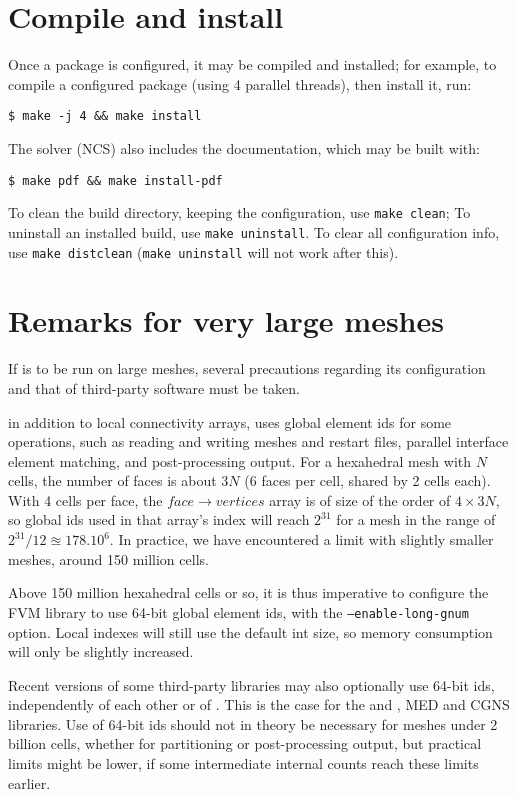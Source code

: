 \documentclass[a4paper,10pt,twoside]{article}
\begin{document}
\section{Compile and install\label{sec:compile}}

Once a package is configured, it may be compiled and installed;
for example, to compile a configured package (using 4 parallel threads),
then install it, run:

\texttt{\$ make -j 4 \&\& make install}

The solver (NCS) also includes the documentation, which may be built
with:

\texttt{\$ make pdf \&\& make install-pdf}

To clean the build directory, keeping the configuration,
use \texttt{make clean};
To uninstall an installed build, use \texttt{make uninstall}.
To clear all configuration info, use \texttt{make distclean}
(\texttt{make uninstall} will not work after this).

\section{Remarks for very large meshes\label{sec:config:largemesh}}

If \CS is to be run on large meshes, several precautions regarding
its configuration and that of third-party software must be taken.

in addition to local connectivity arrays, \CS uses global element ids
for some operations, such as reading and writing meshes and restart files,
parallel interface element matching, and post-processing output.
For a hexahedral mesh with $N$ cells,
the number of faces is about $3N$ (6 faces per cell, shared by 2 cells each).
With 4 cells per face, the $face \rightarrow vertices$ array is of size
of the order of $4\times3N$, so global ids used in that array's index
will reach $2^{31}$ for a mesh in the range of $2^{31} / 12 \approxeq 178.10^6$.
In practice, we have encountered a limit with slightly smaller meshes,
around 150 million cells.

Above 150 million hexahedral cells or so, it is thus imperative to configure
the FVM library to use 64-bit global element ids, with the
{\tt --enable-long-gnum} option. Local indexes will still use
the default {int} size, so memory consumption will only be slightly
increased.

Recent versions of some third-party libraries may also optionally use 64-bit ids,
independently of each other or of \CS.
This is the case for the \scotch and \metis, MED and
CGNS libraries. Use of 64-bit ids should not in theory be necessary
for meshes under 2 billion cells, whether for partitioning or post-processing
output, but practical limits might be lower, if some intermediate internal counts
reach these limits earlier.
\end{document}
